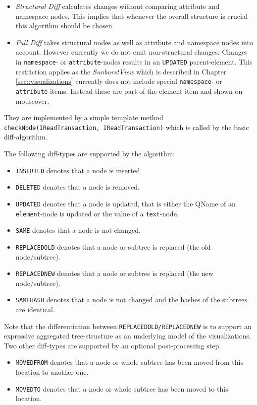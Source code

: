 \begin{itemize}
\item \emph{Structural Diff} calculates changes without comparing attribute and namespace nodes. This implies that whenever the overall structure is crucial this algorithm should be chosen.
\item \emph{Full Diff} takes structural nodes as well as attribute and namespace nodes into account. However currently we do not emit non-structural changes. Changes in \texttt{namespace}- or \texttt{attribute}-nodes results in an \texttt{UPDATED} parent-element. This restriction applies as the \emph{SunburstView} which is described in Chapter \ref{sec::visualizations} currently does not include special \texttt{namespace}- or \texttt{attribute}-items. Instead these are part of the element item and shown on mouseover.
\end{itemize}
They are implemented by a simple template method\\ \texttt{checkNode(IReadTransaction, IReadTransaction)} which is called by the basic diff-algorithm.

The following diff-types are supported by the algorithm:

\begin{itemize}
\item \texttt{INSERTED} denotes that a node is inserted.
\item \texttt{DELETED} denotes that a node is removed.
\item \texttt{UPDATED} denotes that a node is updated, that is either the QName of an \texttt{element}-node is updated or the value of a \texttt{text}-node.
\item \texttt{SAME} denotes that a node is not changed.
\item \texttt{REPLACEDOLD} denotes that a node or subtree is replaced (the old node/subtree).
\item \texttt{REPLACEDNEW} denotes that a node or subtree is replaced (the new node/subtree).
\item \texttt{SAMEHASH} denotes that a node is not changed and the hashes of the subtrees are identical.
\end{itemize}

Note that the differentiation between \texttt{REPLACEDOLD/REPLACEDNEW} is to support an expressive aggregated tree-structure as an underlying model of the visualizations. Two other diff-types are supported by an optional post-processing step.

\begin{itemize}
\item \texttt{MOVEDFROM} denotes that a node or whole subtree has been moved from this location to another one.
\item \texttt{MOVEDTO} denotes that a node or whole subtree has been moved to this location.
\end{itemize}

